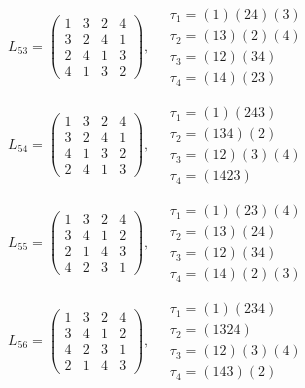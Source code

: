 $L_{53} = \begin{pmatrix} 1 & 3 & 2 & 4 \\ 3 & 2 & 4 & 1 \\ 2 & 4 & 1 & 3 \\ 4 & 1 & 3 & 2 \end{pmatrix}, \quad \begin{matrix} \tau_{1} = (1)(2 4)(3) \\ \tau_{2} = (1 3)(2)(4) \\ \tau_{3} = (1 2)(3 4) \\ \tau_{4} = (1 4)(2 3) \end{matrix}$

$L_{54} = \begin{pmatrix} 1 & 3 & 2 & 4 \\ 3 & 2 & 4 & 1 \\ 4 & 1 & 3 & 2 \\ 2 & 4 & 1 & 3 \end{pmatrix}, \quad \begin{matrix} \tau_{1} = (1)(2 4 3) \\ \tau_{2} = (1 3 4)(2) \\ \tau_{3} = (1 2)(3)(4) \\ \tau_{4} = (1 4 2 3) \end{matrix}$

$L_{55} = \begin{pmatrix} 1 & 3 & 2 & 4 \\ 3 & 4 & 1 & 2 \\ 2 & 1 & 4 & 3 \\ 4 & 2 & 3 & 1 \end{pmatrix}, \quad \begin{matrix} \tau_{1} = (1)(2 3)(4) \\ \tau_{2} = (1 3)(2 4) \\ \tau_{3} = (1 2)(3 4) \\ \tau_{4} = (1 4)(2)(3) \end{matrix}$

$L_{56} = \begin{pmatrix} 1 & 3 & 2 & 4 \\ 3 & 4 & 1 & 2 \\ 4 & 2 & 3 & 1 \\ 2 & 1 & 4 & 3 \end{pmatrix}, \quad \begin{matrix} \tau_{1} = (1)(2 3 4) \\ \tau_{2} = (1 3 2 4) \\ \tau_{3} = (1 2)(3)(4) \\ \tau_{4} = (1 4 3)(2) \end{matrix}$

